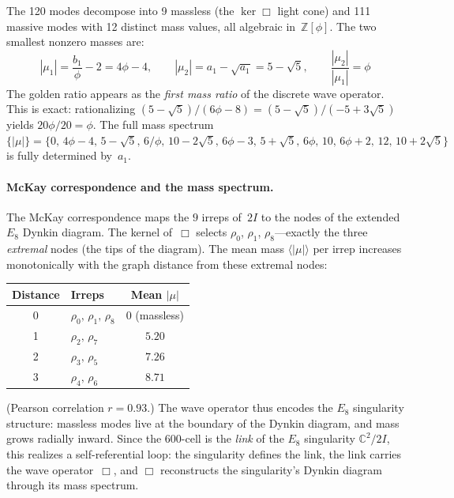 \documentclass[12pt,a4paper]{article}
\theoremstyle{definition}
\begin{document}
The 120 modes decompose into 9 massless (the $\ker\Box$ light cone) and 111 massive modes with 12 distinct mass values, all algebraic in~$\mathbb{Z}[\phi]$.  The two smallest nonzero masses are:
\begin{equation}
|\mu_1| = \frac{b_1}{\phi} - 2 = 4\phi - 4, \qquad
|\mu_2| = a_1 - \sqrt{a_1} = 5 - \sqrt{5}, \qquad
\frac{|\mu_2|}{|\mu_1|} = \phi
\label{eq:mass_ratio_phi}
\end{equation}
The golden ratio appears as the \emph{first mass ratio} of the discrete wave operator.  This is exact: rationalizing $(5\!-\!\sqrt{5})/(6\phi\!-\!8) = (5\!-\!\sqrt{5})/({-}5\!+\!3\sqrt{5})$ yields $20\phi/20 = \phi$.  The full mass spectrum $\{|\mu|\} = \{0,\, 4\phi\!-\!4,\, 5\!-\!\sqrt{5},\, 6/\phi,\, 10\!-\!2\sqrt{5},\, 6\phi\!-\!3,\, 5\!+\!\sqrt{5},\, 6\phi,\, 10,\, 6\phi\!+\!2,\, 12,\, 10\!+\!2\sqrt{5}\}$ is fully determined by~$a_1$.

\paragraph{McKay correspondence and the mass spectrum.}
The McKay correspondence maps the $9$ irreps of~$2I$ to the nodes of the extended $E_8$ Dynkin diagram.  The kernel of~$\Box$ selects $\rho_0$, $\rho_1$, $\rho_8$---exactly the three \emph{extremal} nodes (the tips of the diagram).  The mean mass $\langle|\mu|\rangle$ per irrep increases monotonically with the graph distance from these extremal nodes:
\begin{center}
\begin{tabular}{clc}
\toprule
Distance & Irreps & Mean $|\mu|$ \\
\midrule
0 & $\rho_0,\, \rho_1,\, \rho_8$ & $0$ (massless) \\
1 & $\rho_2,\, \rho_7$ & $5.20$ \\
2 & $\rho_3,\, \rho_5$ & $7.26$ \\
3 & $\rho_4,\, \rho_6$ & $8.71$ \\
\bottomrule
\end{tabular}
\end{center}
(Pearson correlation $r = 0.93$.)  The wave operator thus encodes the $E_8$ singularity structure: massless modes live at the boundary of the Dynkin diagram, and mass grows radially inward.  Since the 600-cell is the \emph{link} of the $E_8$ singularity $\mathbb{C}^2/2I$, this realizes a self-referential loop: the singularity defines the link, the link carries the wave operator~$\Box$, and $\Box$ reconstructs the singularity's Dynkin diagram through its mass spectrum.
\end{document}
